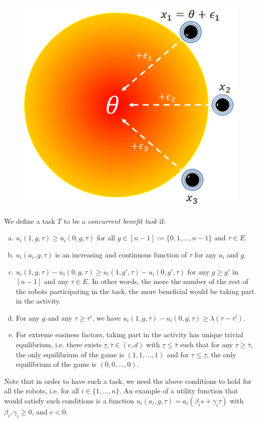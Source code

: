 \documentclass[conference]{ieeeconf}
\begin{document}
\begin{figure}[!htb]
\centering\includegraphics[width=.75\columnwidth]{../figures/globalgamesetup.png}
\centering\caption{}\label{fig:ggsetup}
\end{figure}

We define a task $T$ to be a \textit{concurrent benefit task} if: 
\begin{enumerate}[a.]
	\item $u_i(1,g,\tau)\geq u_i(0,g,\tau)$ for all $g\in[n-1]:=\{0,1,\ldots,n-1\}$ and $\tau \in E$. 
	\item $u_i(a_i,g,\tau)$ is an increasing and continuous function of $\tau$ for any $a_i$ and $g$. 
	\item $u_i(1,g,\tau)-u_i(0,g,\tau)\geq u_i(1,g',\tau)-u_i(0,g',\tau)$ for any $g\geq g'$ in $[n-1]$ and any $\tau\in E$. In other words, the more the number of the rest of the robots participating in the task, the more beneficial would be taking part in the activity.
	\item For any $g$ and any $\tau\geq \tau'$, we have $u_i(1,g,\tau)-u_i(0,g,\tau)\geq \lambda (\tau-\tau')$. 
	\item For extreme easiness factors, taking part in the activity has unique trivial equilibrium, i.e. there exists $\underline{\tau},\bar{\tau}\in (c,d)$ with $\underline{\tau}\leq \bar{\tau}$ such that for any $\tau\geq \bar{\tau}$, the only equilibrium of the game is $(1,1,\ldots,1)$ and for $\tau\leq \underline{\tau}$, the only equilibrium of the game is $(0,0,\ldots,0)$.
\end{enumerate}

Note that in order to have such a task, we need the above conditions to hold for all the robots, i.e. for all $i\in\{1,\ldots,n\}$.
An example of a utility function that would satisfy such conditions is a function $u_i(a_i,g,\tau)=a_i(\beta_is+\gamma_i\tau)$ with $\beta_i,\gamma_i\geq 0$, and $c<0$.
\end{document}
